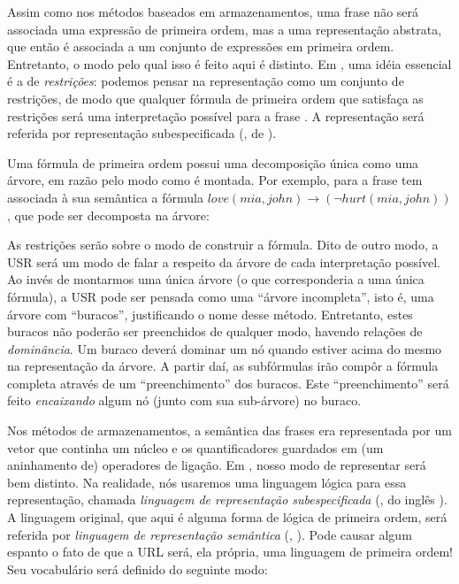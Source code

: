 Assim como nos métodos baseados em armazenamentos, uma frase não será associada uma expressão de primeira ordem, mas a uma representação abstrata, que então é associada a um conjunto de expressões em primeira ordem. Entretanto, o modo pelo qual isso é feito aqui é distinto. Em , uma idéia essencial é a de \textit{restrições}: podemos pensar na representação como um conjunto de restrições, de modo que qualquer fórmula de primeira ordem que satisfaça as restrições será uma interpretação possível para a frase \cite[p.~129]{BlackburnBos:2005}. A representação será referida por representação subespecificada (, de ).

Uma fórmula de primeira ordem possui uma decomposição única como uma árvore, em razão pelo modo como é montada. Por exemplo, para a frase  tem associada à sua semântica a fórmula $love(mia,john) \rightarrow (\neg hurt(mia,john))$, que pode ser decomposta na árvore:

\begin{center}
\end{center}

As restrições serão sobre o modo de construir a fórmula. Dito de outro modo, a USR será um modo de falar a respeito da árvore de cada interpretação possível. Ao invés de montarmos uma única árvore (o que corresponderia a uma única fórmula), a USR pode ser pensada como uma ``árvore incompleta'', isto é, uma árvore com ``buracos'', justificando o nome desse método. Entretanto, estes buracos não poderão ser preenchidos de qualquer modo, havendo relações de \textit{dominância}. Um buraco deverá dominar um nó quando estiver acima do mesmo na representação da árvore. A partir daí, as subfórmulas irão compôr a fórmula completa através de um ``preenchimento'' dos buracos. Este ``preenchimento'' será feito \textit{encaixando} algum nó (junto com sua sub-árvore) no buraco.

Nos métodos de armazenamentos, a semântica das frases era representada por um vetor que continha um núcleo e os quantificadores guardados em (um aninhamento de) operadores de ligação. Em , nosso modo de representar será bem distinto. Na realidade, nós usaremos uma linguagem lógica para essa representação, chamada \textit{linguagem de representação subespecificada} (, do inglês ). A linguagem original, que aqui é alguma forma de lógica de primeira ordem, será referida por \textit{linguagem de representação semântica} (, ). Pode causar algum espanto o fato de que a URL será, ela própria, uma linguagem de primeira ordem! Seu vocabulário será definido do seguinte modo:

